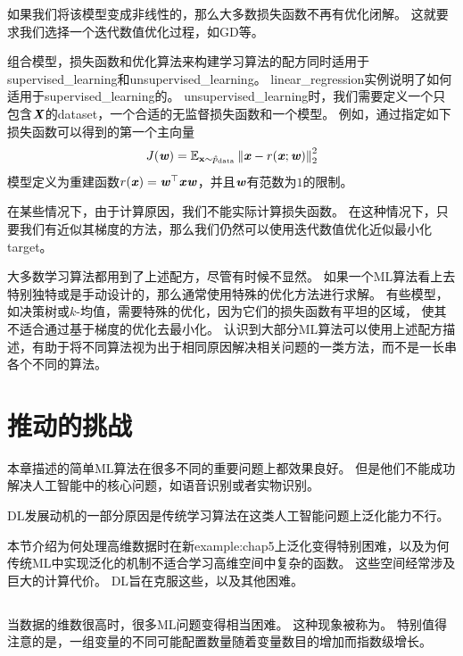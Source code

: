 如果我们将该模型变成非线性的，那么大多数损失函数不再有优化闭解。
这就要求我们选择一个迭代数值优化过程，如\gls{GD}等。

组合模型，损失函数和优化算法来构建学习算法的配方同时适用于\gls{supervised_learning}和\gls{unsupervised_learning}。
\gls{linear_regression}实例说明了如何适用于\gls{supervised_learning}的。
\gls{unsupervised_learning}时，我们需要定义一个只包含$\boldsymbol{\mathit{X}}$的\gls{dataset}，一个合适的无监督损失函数和一个模型。
例如，通过指定如下损失函数可以得到的第一个主向量
\begin{equation}
    J(\boldsymbol{\mathit{w}}) = \mathbb{E}_{\mathbf{x} \sim \hat{p}_{\text{data}}} \left\lVert\boldsymbol{\mathit{x}} - r(\boldsymbol{\mathit{x}}; \boldsymbol{\mathit{w}})\right\rVert_2^2
\end{equation}
模型定义为重建函数$r(\boldsymbol{\mathit{x}}) = \boldsymbol{\mathit{w}}^\top\boldsymbol{\mathit{x}} \boldsymbol{\mathit{w}}$，并且$\boldsymbol{\mathit{w}}$有范数为$1$的限制。

在某些情况下，由于计算原因，我们不能实际计算损失函数。
在这种情况下，只要我们有近似其梯度的方法，那么我们仍然可以使用迭代数值优化近似最小化\gls{target}。

大多数学习算法都用到了上述配方，尽管有时候不显然。
如果一个\gls{ML}算法看上去特别独特或是手动设计的，那么通常使用特殊的优化方法进行求解。
有些模型，如决策树或$k$-均值，需要特殊的优化，因为它们的损失函数有平坦的区域，
使其不适合通过基于梯度的优化去最小化。
认识到大部分\gls{ML}算法可以使用上述配方描述，有助于将不同算法视为出于相同原因解决相关问题的一类方法，而不是一长串各个不同的算法。


\section{推动的挑战}
\label{sec:challenges_motivating_deep_learning}
本章描述的简单\gls{ML}算法在很多不同的重要问题上都效果良好。
但是他们不能成功解决人工智能中的核心问题，如语音识别或者实物识别。

\gls{DL}发展动机的一部分原因是传统学习算法在这类人工智能问题上泛化能力不行。

本节介绍为何处理高维数据时在新\gls{example:chap5}上泛化变得特别困难，以及为何传统\gls{ML}中实现泛化的机制不适合学习高维空间中复杂的函数。
这些空间经常涉及巨大的计算代价。
\gls{DL}旨在克服这些，以及其他困难。

\subsection{}
\label{sec:the_curse_of_dimensionality}
当数据的维数很高时，很多\gls{ML}问题变得相当困难。
这种现象被称为。
特别值得注意的是，一组变量的不同可能配置数量随着变量数目的增加而指数级增长。

